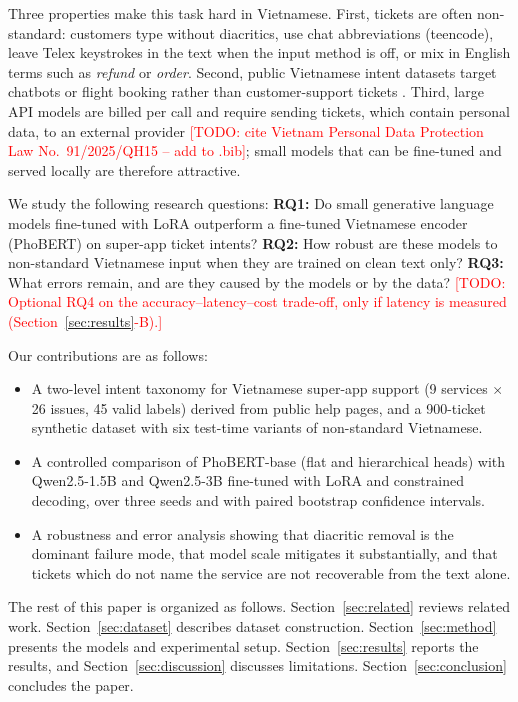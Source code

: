 \documentclass[conference]{IEEEtran}
\newcommand{\TODO}[1]{\textcolor{red}{[TODO: #1]}}
\begin{document}
Three properties make this task hard in Vietnamese. First, tickets are
often non-standard: customers type without diacritics, use chat
abbreviations (teencode), leave Telex keystrokes in the text when the input
method is off, or mix in English terms such as \textit{refund} or
\textit{order}. Second, public Vietnamese intent datasets target chatbots
or flight booking rather than customer-support tickets
\cite{tran2020understanding}. Third, large API models are billed per call
and require sending tickets, which contain personal data, to an external
provider \TODO{cite Vietnam Personal Data Protection Law No.~91/2025/QH15 --
add to .bib}; small models that can be fine-tuned and served locally are
therefore attractive.

We study the following research questions:
\textbf{RQ1:} Do small generative language models fine-tuned with LoRA
outperform a fine-tuned Vietnamese encoder (PhoBERT) on super-app ticket
intents?
\textbf{RQ2:} How robust are these models to non-standard Vietnamese input
when they are trained on clean text only?
\textbf{RQ3:} What errors remain, and are they caused by the models or by
the data?
\TODO{Optional RQ4 on the accuracy--latency--cost trade-off, only if latency
is measured (Section~\ref{sec:results}-B).}

Our contributions are as follows:
\begin{itemize}
\item A two-level intent taxonomy for Vietnamese super-app support
(9 services $\times$ 26 issues, 45 valid labels) derived from public help
pages, and a 900-ticket synthetic dataset with six test-time variants of
non-standard Vietnamese.
\item A controlled comparison of PhoBERT-base (flat and hierarchical heads)
with Qwen2.5-1.5B and Qwen2.5-3B fine-tuned with LoRA and constrained
decoding, over three seeds and with paired bootstrap confidence intervals.
\item A robustness and error analysis showing that diacritic removal is the
dominant failure mode, that model scale mitigates it substantially, and
that tickets which do not name the service are not recoverable from the
text alone.
\end{itemize}

The rest of this paper is organized as follows. Section~\ref{sec:related}
reviews related work. Section~\ref{sec:dataset} describes dataset
construction. Section~\ref{sec:method} presents the models and experimental
setup. Section~\ref{sec:results} reports the results, and
Section~\ref{sec:discussion} discusses limitations. Section~\ref{sec:conclusion}
concludes the paper.
\end{document}
